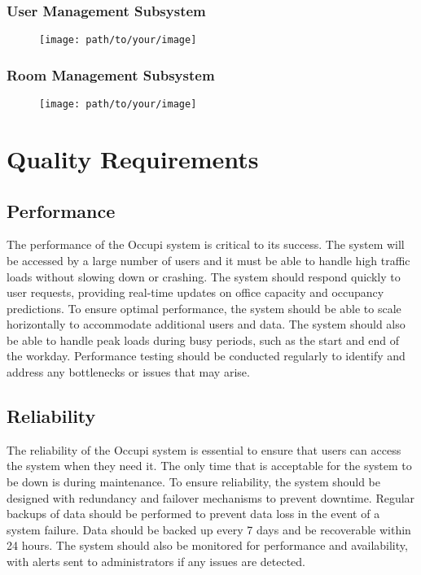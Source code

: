 \documentclass[11pt,a4paper]{article}
\begin{document}
\pagebreak
\subsubsection*{User Management Subsystem}
\begin{figure}[htbp]
    \centering
    \texttt{[image: path/to/your/image]}
\end{figure}

\subsubsection*{Room Management Subsystem}
\begin{figure}[htbp]
    \centering
    \texttt{[image: path/to/your/image]}
\end{figure}

\pagebreak

\section*{Quality Requirements}

\subsection*{Performance}
The performance of the Occupi system is critical to its success. The system will be accessed by a large number of users and it must be able to handle high traffic loads without slowing down or crashing. The system should respond quickly to user requests, providing real-time updates on office capacity and occupancy predictions. To ensure optimal performance, the system should be able to scale horizontally to accommodate additional users and data. The system should also be able to handle peak loads during busy periods, such as the start and end of the workday. Performance testing should be conducted regularly to identify and address any bottlenecks or issues that may arise.

\subsection*{Reliability}
The reliability of the Occupi system is essential to ensure that users can access the system when they need it. The only time that is acceptable for the system to be down is during maintenance. To ensure reliability, the system should be designed with redundancy and failover mechanisms to prevent downtime. Regular backups of data should be performed to prevent data loss in the event of a system failure. Data should be backed up every 7 days and be recoverable within 24 hours. The system should also be monitored for performance and availability, with alerts sent to administrators if any issues are detected.
\end{document}
